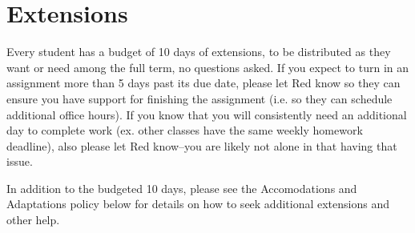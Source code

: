 \section{Extensions}
Every student has a budget of 10 days of extensions, to be distributed as they want or need among the full term, no questions asked. If you expect to turn in an assignment more than 5 days past its due date, please let Red know so they can ensure you have support for finishing the assignment (i.e. so they can schedule additional office hours). If you know that you will consistently need an additional day to complete work (ex. other classes have the same weekly homework deadline), also please let Red know--you are likely not alone in that having that issue.

In addition to the budgeted 10 days, please see the Accomodations and Adaptations policy below for details on how to seek additional extensions and other help.
